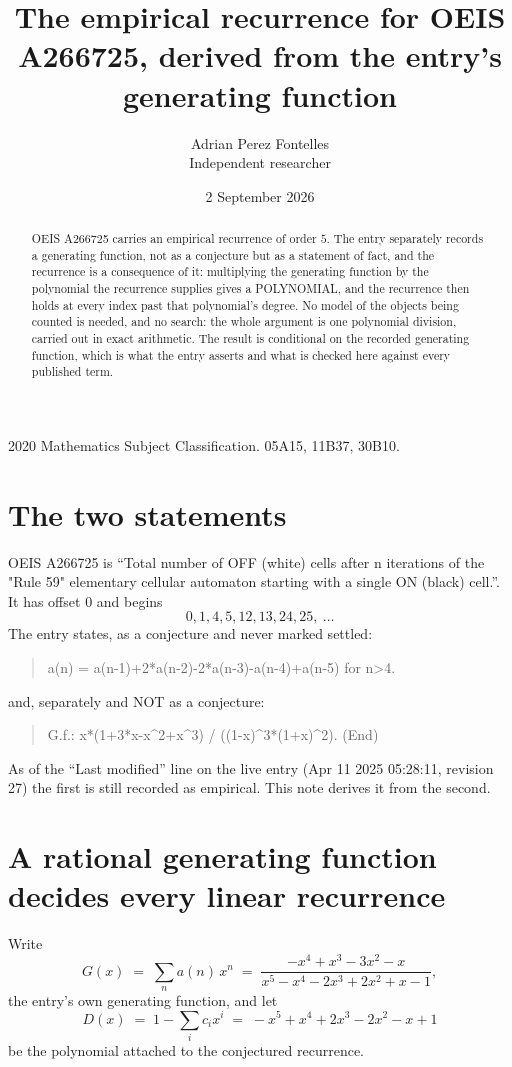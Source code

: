 \documentclass[11pt,a4paper]{article}
\title{The empirical recurrence for OEIS A266725, derived from the entry's generating function}
\author{Adrian Perez Fontelles\\ \small Independent researcher}
\date{2 September 2026}
\theoremstyle{plain}
\theoremstyle{definition}
\begin{document}
\maketitle

\begin{abstract}
OEIS A266725 carries an empirical recurrence of order $5$. The entry separately records a
generating function, not as a conjecture but as a statement of fact, and the recurrence is a
consequence of it: multiplying the generating function by the polynomial the recurrence
supplies gives a POLYNOMIAL, and the recurrence then holds at every index past that
polynomial's degree. No model of the objects being counted is needed, and no search: the
whole argument is one polynomial division, carried out in exact arithmetic. The result is
conditional on the recorded generating function, which is what the entry asserts and what is
checked here against every published term.
\end{abstract}

\noindent\small 2020 Mathematics Subject Classification. 05A15, 11B37, 30B10.\normalsize

\section{The two statements}

OEIS A266725 is ``Total number of OFF (white) cells after n iterations of the "Rule 59" elementary cellular automaton starting with a single ON (black) cell.''. It has offset $0$ and begins
\[
0, 1, 4, 5, 12, 13, 24, 25,\ \dots
\]
The entry states, as a conjecture and never marked settled:
\begin{quote}
a(n) = a(n-1)+2*a(n-2)-2*a(n-3)-a(n-4)+a(n-5) for n>4.
\end{quote}
and, separately and NOT as a conjecture:
\begin{quote}
G.f.: x*(1+3*x-x\^{}2+x\^{}3) / ((1-x)\^{}3*(1+x)\^{}2). (End)
\end{quote}
As of the ``Last modified'' line on the live entry (Apr 11 2025 05:28:11, revision 27) the first is still
recorded as empirical. This note derives it from the second.

\section{A rational generating function decides every linear recurrence}

Write
\[
G(x)\;=\;\sum_{n}a(n)\,x^{n}\;=\;\frac{- x^{4} + x^{3} - 3 x^{2} - x}{x^{5} - x^{4} - 2 x^{3} + 2 x^{2} + x - 1},
\]
the entry's own generating function, and let
\[
D(x)\;=\;1-\sum_i c_i x^{i}\;=\;- x^{5} + x^{4} + 2 x^{3} - 2 x^{2} - x + 1
\]
be the polynomial attached to the conjectured recurrence.
\end{document}
